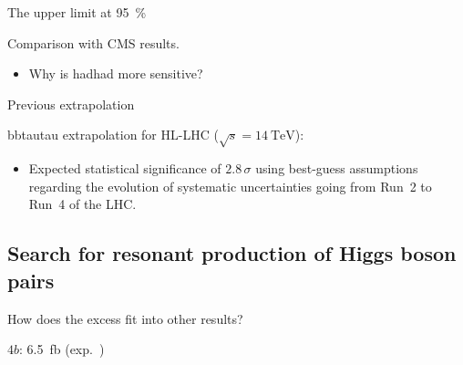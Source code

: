 The upper limit at \SI{95}{\percent}



Comparison with CMS results.

\begin{table}[htbp]
  \centering

  

  \caption{Table of CMS results of searches for non-resonant
    production of Higgs boson pairs with an integrated luminosity of
    \SI{138}{\per\femto\barn}. Upper limits are shown at
    \SI{95}{\percent} CL on the signal strength of the combination of
    the \ggF and VBF production modes.}
  \label{tab:cms_nonresonant}
\end{table}


\begin{itemize}
\item Why is hadhad more sensitive?
\end{itemize}




Previous extrapolation~\cite{ATL-PHYS-PUB-2018-053}

bbtautau extrapolation for HL-LHC ($\sqrt{s} = \SI{14}{\TeV}$):
\cite{ATL-PHYS-PUB-2021-044}
\begin{itemize}
\item Expected statistical significance of $2.8\,\sigma$ using
  best-guess assumptions regarding the evolution of systematic
  uncertainties going from Run~2 to Run~4 of the LHC.
\end{itemize}


\subsection{Search for resonant production of Higgs boson pairs}

How does the excess fit into other results?

$4b$: \SI{6.5}{\femto\barn} (exp.\ )




